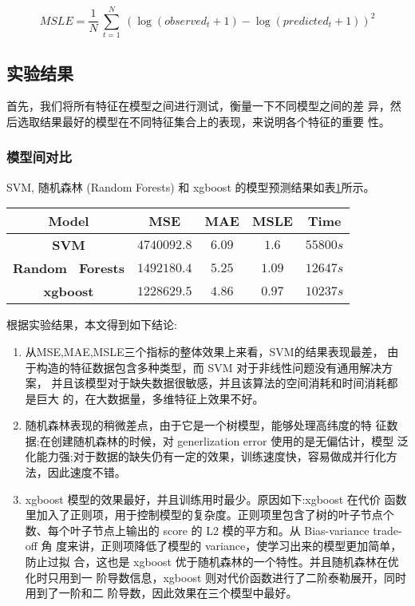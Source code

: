  \begin{equation}\label{eq:msle_3}
 	MSLE = \frac{1}{N}~\sum_{t=1}^N~(\log{(observed_t + 1)} - \log{(predicted_t + 1)})^2
 \end{equation}
 
\subsection{实验结果}
首先，我们将所有特征在模型之间进行测试，衡量一下不同模型之间的差 异，然后选取结果最好的模型在不同特征集合上的表现，来说明各个特征的重要 性。
\subsubsection{模型间对比}
SVM, 随机森林 (Random Forests) 和 xgboost 的模型预测结果如表\ref{tab:3_5}所示。
\begin{table}[H]
    \centering
    \footnotesize%
      \label{tab:3_5}
    \setlength{\tabcolsep}{15pt}%
    \renewcommand{\arraystretch}{1.2}%
    \begin{tabular}{ccccc}
        \hline
        \textbf{Model} &\textbf{ MSE} & \textbf{MAE} & \textbf{MSLE }& \textbf{Time }\\
        \hline
         \textbf{SVM} & $4740092.8$ & $6.09$ & $1.6$ & $55800s$ \\
        \textbf{ Random ~Forests } & $1492180.4$ & $5.25$ & $1.09$  & $12647s$ \\
        \textbf{ xgboost }& $1228629.5$ & $4.86$ & $0.97$  & $10237s$ \\
        	\hline
    \end{tabular}
     
\end{table}
 
根据实验结果，本文得到如下结论:
 \begin{enumerate}
\item 从MSE,MAE,MSLE三个指标的整体效果上来看，SVM的结果表现最差， 由于构造的特征数据包含多种类型，而 SVM 对于非线性问题没有通用解决方案， 并且该模型对于缺失数据很敏感，并且该算法的空间消耗和时间消耗都是巨大 的，在大数据量，多维特征上效果不好。
\item 随机森林表现的稍微差点，由于它是一个树模型，能够处理高纬度的特 征数据;在创建随机森林的时候，对 generlization error 使用的是无偏估计，模型 泛化能力强;对于数据的缺失仍有一定的效果，训练速度快，容易做成并行化方 法，因此速度不错。
\item xgboost 模型的效果最好，并且训练用时最少。原因如下:xgboost 在代价 函数里加入了正则项，用于控制模型的复杂度。正则项里包含了树的叶子节点个 数、每个叶子节点上输出的 score 的 L2 模的平方和。从 Bias-variance trade-off 角 度来讲，正则项降低了模型的 variance，使学习出来的模型更加简单，防止过拟 合，这也是 xgboost 优于随机森林的一个特性。并且随机森林在优化时只用到一 阶导数信息，xgboost 则对代价函数进行了二阶泰勒展开，同时用到了一阶和二 阶导数，因此效果在三个模型中最好。 \end{enumerate}
 

